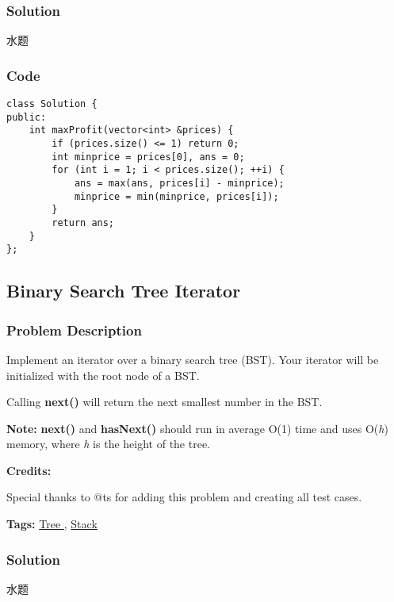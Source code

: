 \documentclass{article}
\begin{document}
\begin{CJK*}{UTF8}{gkai}

\subsubsection*{Solution}
水题

\subsubsection*{Code}
\begin{lstlisting}
class Solution {
public:
    int maxProfit(vector<int> &prices) {
        if (prices.size() <= 1) return 0;
        int minprice = prices[0], ans = 0;
        for (int i = 1; i < prices.size(); ++i) {
            ans = max(ans, prices[i] - minprice);
            minprice = min(minprice, prices[i]);
        }
        return ans;
    }
}; 
\end{lstlisting}


\subsection{ Binary Search Tree Iterator }
\label{ Binary Search Tree Iterator }

\subsubsection*{Problem Description}
Implement an iterator over a binary search tree (BST). Your iterator will be initialized with the root node of a BST.

Calling \textbf{next()} will return the next smallest number in the BST.

\textbf{Note: }\textbf{next()} and \textbf{hasNext()} should run in average O(1) time and uses O(\emph{h}) memory, where \emph{h} is the height of the tree.

\textbf{Credits:}

Special thanks to @ts for adding this problem and creating all test cases.


\textbf{Tags: }
\hyperref[ Tree ]{ Tree },  \hyperref[ Stack ]{ Stack }



\subsubsection*{Solution}
水题


\end{CJK*}
\end{document}
